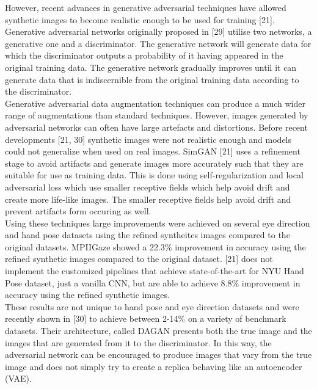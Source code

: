 \documentclass{article}
\begin{document}
However, recent advances in generative adversarial techniques have allowed synthetic images to become realistic enough to be used for training [21]. Generative adversarial networks originally proposed in [29] utilise two networks, a generative one and a discriminator. The generative network will generate data for which the discriminator outputs a probability of it having appeared in the original training data. The generative network gradually improves until it can generate data that is indiscernible from the original training data according to the discriminator. \\

Generative adversarial data augmentation techniques can produce a much wider range of augmentations than standard techniques. However, images generated by adversarial networks can often have large artefacts and distortions. Before recent developments [21, 30] synthetic images were not realistic enough and models could not generalize when used on real images. SimGAN [21] uses a refinement stage to avoid artifacts and generate images more accurately such that they are suitable for use as training data. This is done using self-regularization and local adversarial loss which use smaller receptive fields which help avoid drift and create more life-like images. The smaller receptive fields help avoid drift and prevent artifacts form occuring as well.\\

Using these techniques large improvements were achieved on several eye direction and hand pose datasets using the refined syntheitcs images compared to the original datasets. MPIIGaze showed a 22.3\% improvement in accuracy using the refined synthetic images compared to the original dataset. [21] does not implement the customized pipelines that achieve state-of-the-art for NYU Hand Pose dataset, just a vanilla CNN, but are able to achieve 8.8\% improvement in accuracy using the refined synthetic images.\\

These results are not unique to hand pose and eye direction datasets and were recently shown in [30] to achieve between 2-14\% on a variety of benchmark datasets. Their architecture, called DAGAN presents both the true image and the images that are generated from it to the discriminator. In this way, the adversarial network can be encouraged to produce images that vary from the true image and does not simply try to create a replica behaving like an autoencoder (VAE).\\
\end{document}

